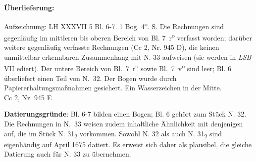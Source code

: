 \begin{ledgroupsized}[r]{120mm}
\footnotesize 
\pstart
\noindent\textbf{\"{U}berlieferung:}
\pend
\end{ledgroupsized}
\begin{ledgroupsized}[r]{114mm}
\footnotesize 
\pstart \parindent -6mm
Aufzeichnung: LH XXXVII 5 Bl. 6-7. 1 Bog. 4\textsuperscript{o}.  S. Die Rechnungen sind gegenl\"{a}ufig im mittleren bis oberen Bereich von Bl. 7~r\textsuperscript{o} verfasst worden; dar\"{u}ber weitere gegenl\"{a}ufig verfasste Rechnungen (Cc 2, Nr. 945 D), die keinen unmittelbar erkennbaren Zusammen\-hang mit N. 33 aufweisen
(sie werden in \textit{LSB} VII ediert).
Der untere Bereich von Bl.~7~r\textsuperscript{o} sowie Bl.~7~v\textsuperscript{o} sind leer;
Bl. 6 überliefert einen Teil von N.~32.
Der Bogen wurde durch Papier\-er\-haltungsmaßnahmen gesichert.
Ein Wasserzeichen in der Mitte.
 \\Cc 2, Nr. 945 E \pend
\end{ledgroupsized}

\vspace*{5mm}
\begin{ledgroup}
\footnotesize 
\pstart
\noindent\footnotesize{\textbf{Datierungsgr\"{u}nde}: Bl. 6-7 bilden einen Bogen; Bl. 6 geh\"{o}rt zum St\"{u}ck N. 32. Die Rechnungen in N.~33 weisen zudem inhaltliche \"{A}hnlichkeit mit denjenigen auf, die im St\"{u}ck N. 31\textsubscript{2} vorkommen. Sowohl N. 32 als auch N. 31\textsubscript{2} sind eigenh\"{a}ndig auf April 1675 datiert. Es erweist sich daher als plausibel, die gleiche Datierung auch f\"{u}r N. 33 zu \"{u}bernehmen.}
\pend
\end{ledgroup}


